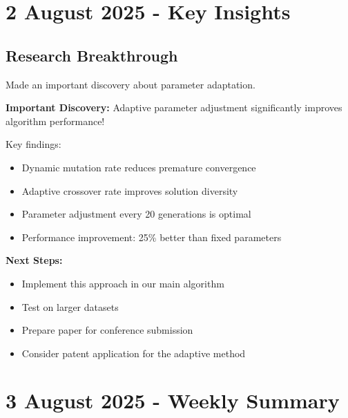 \documentclass[12pt,a4paper,twoside]{article}
\begin{document}

\section{2 August 2025 - Key Insights}

\subsection{Research Breakthrough}
Made an important discovery about parameter adaptation.

\begin{note}
\textbf{Important Discovery:} Adaptive parameter adjustment significantly improves algorithm performance!

Key findings:
\begin{itemize}
    \item Dynamic mutation rate reduces premature convergence
    \item Adaptive crossover rate improves solution diversity
    \item Parameter adjustment every 20 generations is optimal
    \item Performance improvement: 25\% better than fixed parameters
\end{itemize}

\textbf{Next Steps:}
\begin{itemize}
    \item Implement this approach in our main algorithm
    \item Test on larger datasets
    \item Prepare paper for conference submission
    \item Consider patent application for the adaptive method
\end{itemize}
\end{note}


\section{3 August 2025 - Weekly Summary}
\end{document}
